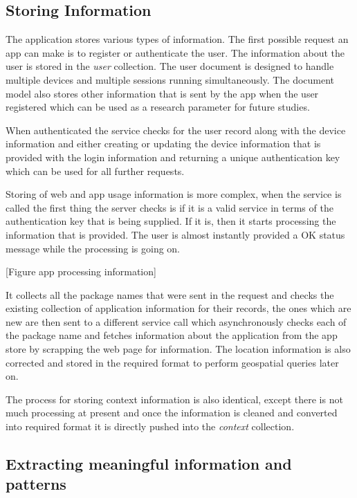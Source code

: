 \documentclass[12pt]{report}
\begin{document}
\subsection{Storing Information}
\label{StoringInfo}

The application stores various types of information. The first possible request an app can make is to register or authenticate the user. The information about the user is stored in the \textit{user} collection. The user document is designed to handle multiple devices and multiple sessions running simultaneously. The document model also stores other information that is sent by the app when the user registered which can be used as a research parameter for future studies.

When authenticated the service checks for the user record along with the device information and either creating or updating the device information that is provided with the login information and returning a unique authentication key which can be used for all further requests.

Storing of web and app usage information is more complex, when the service is called the first thing the server checks is if it is a valid service in terms of the authentication key that is being supplied. If it is, then it starts processing the information that is provided. The user is almost instantly provided a OK status message while the processing is going on.



[Figure app processing information]


It collects all the package names that were sent in the request and checks the existing collection of application information for their records, the ones which are new are then sent to a different service call which asynchronously checks each of the package name and fetches information about the application from the app store by scrapping the web page for information. The location information is also corrected and stored in the required format to perform geospatial queries later on.

The process for storing context information is also identical, except there is not much processing at present and once the information is cleaned and converted into required format it is directly pushed into the \textit{context} collection.

\subsection{Extracting meaningful information and patterns}
\label{ExtractInfo}
\end{document}
